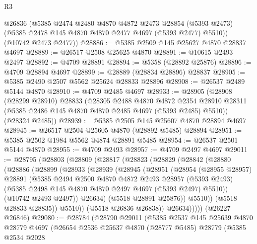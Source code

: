 \begin{lexlean}{R3}
\begin{coremodule}
      @26836
      (@5385
        @2474
        @2480
        @4870
        @4872
        @2473
        @28854
        (@5393 @2473)
        (@5385 @2478 @145 @4870 @4870 @2477 @4697 (@5393 @2477) @5510))
      (@10742 @2473 @2477))
@28886 := @5385 @2509 @145 @25627 @4870 @28837 @4697
@28889 := @26517 @2508 @25625 @4870
@28891 := @10615 @2493 @2497
@28892 := @4709 @28891
@28894 := @5358 (@28892 @25876)
@28896 := @4709 @28894 @4697
@28899 := @28889 (@28834 @28896) @28837
@28905 := @5385 @2490 @2507 @5562 @25624 @28833 @28896
@28908 := @26537 @2489 @5144 @4870
@28910 := @4709 @2485 @4697
@28933 := @28905
    (@28908
      (@28299 @28910)
      @28833
      (@28305
        @2488
        @4870
        @4872
        @2354
        @28910
        @28311
        (@5385 @2486 @145 @4870 @4870 @2485 @4697 (@5393 @2485) @5510))
      (@28324 @2485))
@28939 := @5385 @2505 @145 @25607 @4870 @28894 @4697
@28945 := @26517 @2504 @25605 @4870 (@28892 @5485) @28894
@28951 := @5385 @2502 @1984 @5562 @4874 @28891 @5485
@28954 := @26537 @2501 @5144 @4870
@28955 := @4709 @2493
@28957 := @4709 @2497 @4697
@29011 := @28795
    (@28803
      (@28809
        (@28817
          (@28823
            (@28829
              (@28842
                (@28880
                  (@28886
                    (@28899
                      (@28933
                        (@28939
                          (@28945
                            (@28951
                              (@28954
                                (@28955 @28957)
                                @28891
                                (@5385
                                  @2494
                                  @2500
                                  @4870
                                  @4872
                                  @2493
                                  @28957
                                  (@5393 @2493)
                                  (@5385 @2498 @145 @4870 @4870 @2497 @4697 (@5393 @2497) @5510))
                                (@10742 @2493 @2497))
                              @26634)
                            (@5518 @28891 @25876))
                          @5510))
                      (@5518 @28833 @28835))
                    @5510))
                (@5518 @26836 @26838))
              @26634)))))
    (@26227 @26846)
@29080 := @28784
    (@28790
      @29011
      (@5385
        @2537
        @145
        @25639
        @4870
        @28779
        @4697
        (@26654
          @2536
          @25637
          @4870
          (@28777 @5485)
          @28779
          (@5385
            @2534
            @2028

\end{coremodule}
\end{lexlean}
